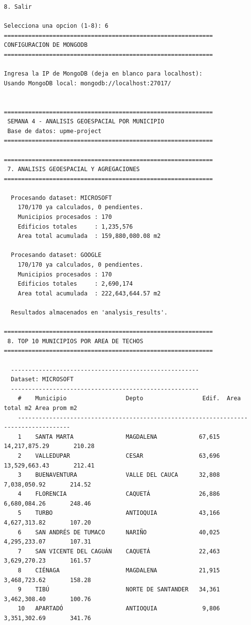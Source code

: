 \documentclass[12pt,a4paper]{article}
\begin{document}
\begin{lstlisting}[style=evidence]
8. Salir

Selecciona una opcion (1-8): 6
============================================================
CONFIGURACION DE MONGODB
============================================================

Ingresa la IP de MongoDB (deja en blanco para localhost): 
Usando MongoDB local: mongodb://localhost:27017/


============================================================
 SEMANA 4 - ANALISIS GEOESPACIAL POR MUNICIPIO
 Base de datos: upme-project
============================================================

============================================================
 7. ANALISIS GEOESPACIAL Y AGREGACIONES
============================================================

  Procesando dataset: MICROSOFT
    170/170 ya calculados, 0 pendientes.
    Municipios procesados : 170
    Edificios totales     : 1,235,576
    Area total acumulada  : 159,880,080.08 m2

  Procesando dataset: GOOGLE
    170/170 ya calculados, 0 pendientes.
    Municipios procesados : 170
    Edificios totales     : 2,690,174
    Area total acumulada  : 222,643,644.57 m2

  Resultados almacenados en 'analysis_results'.

============================================================
 8. TOP 10 MUNICIPIOS POR AREA DE TECHOS
============================================================

  ------------------------------------------------------
  Dataset: MICROSOFT
  ------------------------------------------------------
    #    Municipio                 Depto                 Edif.  Area total m2 Area prom m2
    -------------------------------------------------------------------------------------
    1    SANTA MARTA               MAGDALENA            67,615  14,217,875.29       210.28
    2    VALLEDUPAR                CESAR                63,696  13,529,663.43       212.41
    3    BUENAVENTURA              VALLE DEL CAUCA      32,808   7,038,050.92       214.52
    4    FLORENCIA                 CAQUETÁ              26,886   6,680,084.26       248.46
    5    TURBO                     ANTIOQUIA            43,166   4,627,313.82       107.20
    6    SAN ANDRÉS DE TUMACO      NARIÑO               40,025   4,295,233.07       107.31
    7    SAN VICENTE DEL CAGUÁN    CAQUETÁ              22,463   3,629,270.23       161.57
    8    CIÉNAGA                   MAGDALENA            21,915   3,468,723.62       158.28
    9    TIBÚ                      NORTE DE SANTANDER   34,361   3,462,308.40       100.76
    10   APARTADÓ                  ANTIOQUIA             9,806   3,351,302.69       341.76


\end{lstlisting}
\end{document}
